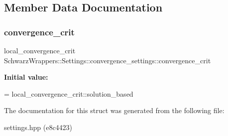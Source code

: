 \subsection{Member Data Documentation}
\mbox{\label{structSchwarzWrappers_1_1Settings_1_1convergence__settings_ac02528dbce2827b664ba9e7545f1cfdc}} 
\subsubsection{\texorpdfstring{convergence\+\_\+crit}{convergence\_crit}}
{\footnotesize\ttfamily local\+\_\+convergence\+\_\+crit Schwarz\+Wrappers\+::\+Settings\+::convergence\+\_\+settings\+::convergence\+\_\+crit}

{\bfseries Initial value\+:}
\begin{DoxyCode}
=
            local\_convergence\_crit::solution\_based
\end{DoxyCode}


The documentation for this struct was generated from the following file\+:\begin{DoxyCompactItemize}
\item 
settings.\+hpp (e8c4423)\end{DoxyCompactItemize}

